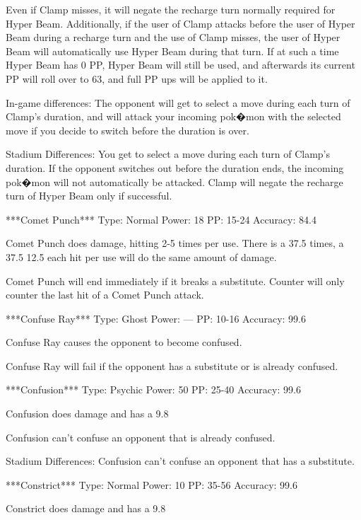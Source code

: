 \documentclass[reprint, aps, prl, paper=A4]{revtex4-1}
\begin{document}
Even if Clamp misses, it will negate the recharge turn normally required for Hyper Beam.
Additionally, if the user of Clamp attacks before the user of Hyper Beam during a recharge turn
and the use of Clamp misses, the user of Hyper Beam will automatically use Hyper Beam during
that turn. If at such a time Hyper Beam has 0 PP, Hyper Beam will still be used, and afterwards
its current PP will roll over to 63, and full PP ups will be applied to it.

In-game differences:
The opponent will get to select a move during each turn of Clamp's duration, and will attack
your incoming pok�mon with the selected move if you decide to switch before the duration is
over.

Stadium Differences:
You get to select a move during each turn of Clamp's duration. If the opponent switches out
before the duration ends, the incoming pok�mon will not automatically be attacked. Clamp will
negate the recharge turn of Hyper Beam only if successful.


***Comet Punch***
Type: Normal
Power: 18
PP: 15-24
Accuracy: 84.4%

Comet Punch does damage, hitting 2-5 times per use. There is a 37.5%
times, a 37.5%
12.5%
each hit per use will do the same amount of damage.

Comet Punch will end immediately if it breaks a substitute. Counter will only counter the last
hit of a Comet Punch attack.


***Confuse Ray***
Type: Ghost
Power: ---
PP: 10-16
Accuracy: 99.6%

Confuse Ray causes the opponent to become confused.

Confuse Ray will fail if the opponent has a substitute or is already confused.


***Confusion***
Type: Psychic
Power: 50
PP: 25-40
Accuracy: 99.6%

Confusion does damage and has a 9.8%

Confusion can't confuse an opponent that is already confused.

Stadium Differences:
Confusion can't confuse an opponent that has a substitute.


***Constrict***
Type: Normal
Power: 10
PP: 35-56
Accuracy: 99.6%

Constrict does damage and has a 9.8%
\end{document}
